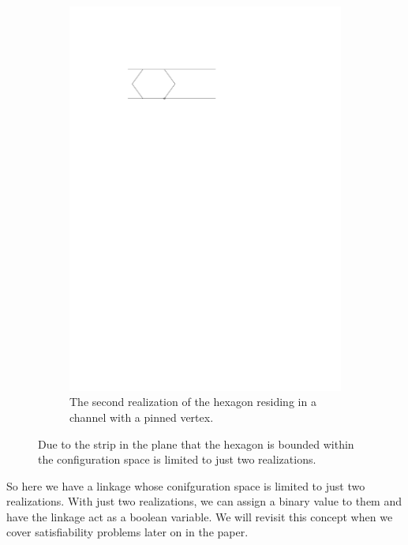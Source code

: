 \begin{figure}[h]
\begin{center}
\begin{subfigure}[b]{0.49\textwidth}
	  \label{fig:linkage-1-1}
  \end{subfigure}
  \begin{subfigure}[b]{0.49\textwidth}
	  \includegraphics[width=\textwidth]{graphics/hexagonInChannelWithPinnedJointLeft.pdf}
	  \caption{The second realization of the hexagon residing in a channel with a pinned 
vertex.}
	  \label{fig:linkage-1-2}
  \end{subfigure}
\end{center} 
\caption{Due to the strip in the plane that the hexagon is bounded within the configuration space is 
limited to just two realizations.}\label{fig:linkage-1}
\end{figure}
So here we have a linkage whose conifguration space is limited to just two realizations.  With just 
two realizations, we can assign a binary value to them and have the linkage act as a boolean 
variable.  We will revisit this concept when we cover satisfiability problems later on in the paper.
